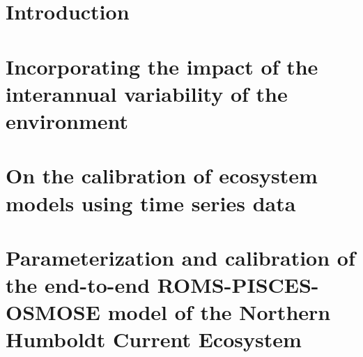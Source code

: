\documentclass[12pt,a4paper]{book}
\begin{document}


\mainmatter



\chapter*{Introduction} 
\thispagestyle{empty}%

\cleardoublepage

\chapter{Incorporating the impact of the interannual variability of the environment}
\label{interannual} 
\thispagestyle{empty}%

\cleardoublepage

\chapter{On the calibration of ecosystem models using time series data} 
\label{EA}
\thispagestyle{empty}%

\cleardoublepage

\chapter{Parameterization and calibration of the end-to-end ROMS-PISCES-OSMOSE model of the Northern Humboldt Current Ecosystem} 
\label{calibration}
\thispagestyle{empty}%


\cleardoublepage

%
\end{document}
